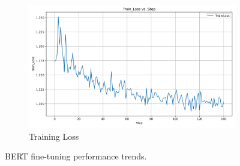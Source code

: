 \documentclass[12pt]{article}
\begin{document}
\begin{figure}[ht]
\begin{subfigure}[b]{0.32\textwidth}
    \includegraphics[width=\linewidth]{BERT_Train_Loss.png}
    \caption{Training Loss}
    \label{fig:bert_train_loss}
\end{subfigure}
\caption{BERT fine-tuning performance trends.}
\label{fig:bert}
\end{figure}
\end{document}
